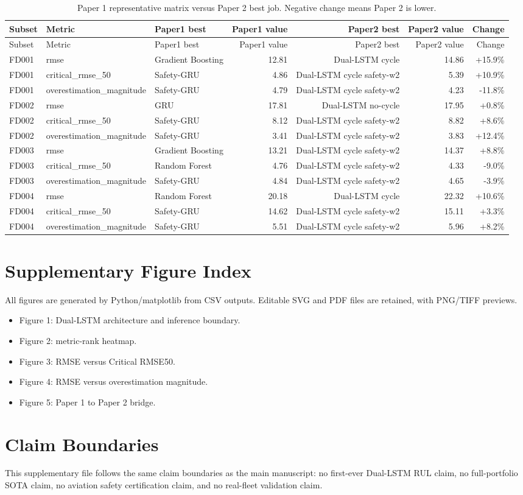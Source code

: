 \documentclass[10pt]{article}
\begin{document}
\scriptsize
\begin{longtable}{lllrrrr}
\caption{Paper 1 representative matrix versus Paper 2 best job. Negative change means Paper 2 is lower.}\\
\toprule
Subset & Metric & Paper1 best & Paper1 value & Paper2 best & Paper2 value & Change \\
\midrule
\endfirsthead
\toprule
Subset & Metric & Paper1 best & Paper1 value & Paper2 best & Paper2 value & Change \\
\midrule
\endhead
FD001 & rmse & Gradient Boosting & 12.81 & Dual-LSTM cycle & 14.86 & +15.9\% \\
FD001 & critical\_rmse\_50 & Safety-GRU & 4.86 & Dual-LSTM cycle safety-w2 & 5.39 & +10.9\% \\
FD001 & overestimation\_magnitude & Safety-GRU & 4.79 & Dual-LSTM cycle safety-w2 & 4.23 & -11.8\% \\
FD002 & rmse & GRU & 17.81 & Dual-LSTM no-cycle & 17.95 & +0.8\% \\
FD002 & critical\_rmse\_50 & Safety-GRU & 8.12 & Dual-LSTM cycle safety-w2 & 8.82 & +8.6\% \\
FD002 & overestimation\_magnitude & Safety-GRU & 3.41 & Dual-LSTM cycle safety-w2 & 3.83 & +12.4\% \\
FD003 & rmse & Gradient Boosting & 13.21 & Dual-LSTM cycle safety-w2 & 14.37 & +8.8\% \\
FD003 & critical\_rmse\_50 & Random Forest & 4.76 & Dual-LSTM cycle safety-w2 & 4.33 & -9.0\% \\
FD003 & overestimation\_magnitude & Safety-GRU & 4.84 & Dual-LSTM cycle safety-w2 & 4.65 & -3.9\% \\
FD004 & rmse & Random Forest & 20.18 & Dual-LSTM cycle & 22.32 & +10.6\% \\
FD004 & critical\_rmse\_50 & Safety-GRU & 14.62 & Dual-LSTM cycle safety-w2 & 15.11 & +3.3\% \\
FD004 & overestimation\_magnitude & Safety-GRU & 5.51 & Dual-LSTM cycle safety-w2 & 5.96 & +8.2\% \\
\bottomrule
\end{longtable}
\normalsize

\section{Supplementary Figure Index}
All figures are generated by Python/matplotlib from CSV outputs. Editable SVG and PDF files are retained, with PNG/TIFF previews.
\begin{itemize}
\item Figure 1: Dual-LSTM architecture and inference boundary.
\item Figure 2: metric-rank heatmap.
\item Figure 3: RMSE versus Critical RMSE50.
\item Figure 4: RMSE versus overestimation magnitude.
\item Figure 5: Paper 1 to Paper 2 bridge.
\end{itemize}

\section{Claim Boundaries}
This supplementary file follows the same claim boundaries as the main manuscript: no first-ever Dual-LSTM RUL claim, no full-portfolio SOTA claim, no aviation safety certification claim, and no real-fleet validation claim.
\end{document}
